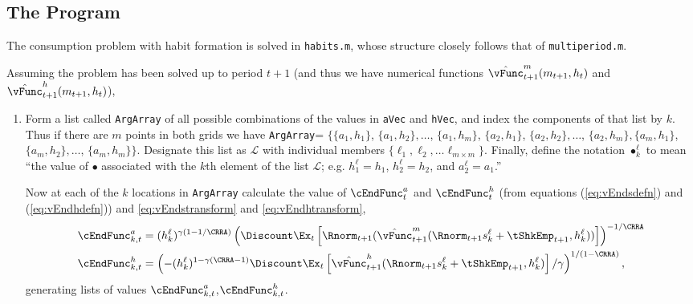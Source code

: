 \documentclass[titlepage]{\econtex}
\begin{document}
{  \hypertarget{The-Program}{}
  \subsection{The Program}
  The consumption problem with habit formation is solved in
  \texttt{habits.m}, whose structure closely follows that of
  \texttt{multiperiod.m}.

  Assuming the problem has been solved up to period $t+1$ (and thus we
  have numerical functions $\hat{\vFunc}_{t+1}^{m}({m}_{t+1},h_{t})$ and
  $\hat{\vFunc}_{t+1}^{h}({m}_{t+1},h_{t})$),
  \begin{enumerate}

  \item Form a list called \texttt{ArgArray} of all possible
    combinations of the values in \texttt{aVec} and
    \texttt{hVec}, and index the components of that list by $k$.  Thus
    if there are $m$ points in both grids we have \texttt{ArgArray}=
    $\{\{{a}_{1},h_{1}\}$, $\{{a}_{1},h_{2}\},\ldots$,
    $\{{a}_{1},h_{m}\}$, $\{{a}_{2},h_{1}\}$,
    $\{{a}_{2},h_{2}\},\ldots$, $\{{a}_{2},h_{m}\},
    \{{a}_{m},h_{1}\}$, $\{{a}_{m},h_{2}\},\ldots$,
    $\{{a}_{m},h_{m}\}\}$.  Designate this list as $\mathcal{L}$
    with individual members $\{\ell_{1}, \ell_{2}, \ldots \ell_{m \times
      m}\}$.  Finally, define the notation $\bullet^{\ell}_{k}$ to mean
    ``the value of $\bullet$ associated with the $k$th element of the
    list $\mathcal{L}$; e.g. $h^{\ell}_{1} = h_{1}$, $h^{\ell}_{2} =
    h_{2}$, and ${a}^{\ell}_{2}={a}_{1}$.''

    Now at each of the $k$ locations in \texttt{ArgArray} calculate the
    value of $\cEndFunc_{t}^{{a}}$ and $\cEndFunc_{t}^{h}$ (from
    equations (\ref{eq:vEndsdefn}) and (\ref{eq:vEndhdefn})) and
    \eqref{eq:vEndstransform} and \eqref{eq:vEndhtransform},
    \begin{equation}\begin{gathered}\begin{aligned}
      \cEndFunc_{k,t}^{{a}}  & = (h_{k}^{\ell})^{\gamma(1-1/\CRRA)}
                                  \left(\Discount \Ex_{t}
                                  \left[
                                  \Rnorm_{t+1} (\hat{\vFunc}_{t+1}^{m}(\Rnorm_{t+1} s^{\ell}_{k} +
                                  {\tShkEmp}_{t+1},h^{\ell}_{k}))
                                  \right]
                                  \right)^{-1/\CRRA}
      \\      \cEndFunc_{k,t}^{h} 
& =                                         \left(-(h_{k}^{\ell})^{1-\gamma(\CRRA-1)} \Discount \Ex_{t}
                                        \left[
                                        \hat{\vFunc}_{t+1}^{h}(\Rnorm_{t+1} s^{\ell}_{k} +
                                        {\tShkEmp}_{t+1},h^{\ell}_{k})
                                        \right]/\gamma
                                        \right)^{1/(1-\CRRA)},
    \end{aligned}\end{gathered}\end{equation}
    generating lists of values
    $\cEndFunc^{a}_{k,t}$,$\cEndFunc^{h}_{k,t}$.


\end{enumerate}}
\end{document}
